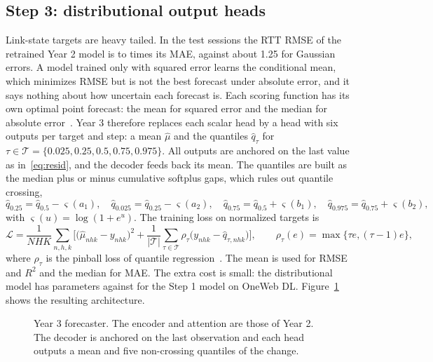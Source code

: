 \subsection{Step 3: distributional output heads}
Link-state targets are heavy tailed. In the test sessions the RTT RMSE of the retrained Year 2 model is \RatioRMSEMAEMin{} to \RatioRMSEMAEMax{} times its MAE, against about 1.25 for Gaussian errors. A model trained only with squared error learns the conditional mean, which minimizes RMSE but is not the best forecast under absolute error, and it says nothing about how uncertain each forecast is. Each scoring function has its own optimal point forecast: the mean for squared error and the median for absolute error~\cite{gneiting2011making}. Year 3 therefore replaces each scalar head by a head with six outputs per target and step: a mean $\hat{\mu}$ and the quantiles $\hat{q}_\tau$ for $\tau\in\mathcal{T}=\{0.025, 0.25, 0.5, 0.75, 0.975\}$. All outputs are anchored on the last value as in~\eqref{eq:resid}, and the decoder feeds back its mean. The quantiles are built as the median plus or minus cumulative softplus gaps, which rules out quantile crossing,
\begin{equation}
\hat{q}_{0.25}=\hat{q}_{0.5}-\varsigma(a_1),\quad \hat{q}_{0.025}=\hat{q}_{0.25}-\varsigma(a_2),\quad
\hat{q}_{0.75}=\hat{q}_{0.5}+\varsigma(b_1),\quad \hat{q}_{0.975}=\hat{q}_{0.75}+\varsigma(b_2),
\end{equation}
with $\varsigma(u)=\log(1+e^u)$. The training loss on normalized targets is
\begin{equation}
\mathcal{L} = \frac{1}{NHK}\sum_{n,h,k}\Big[\big(\hat{\mu}_{nhk}-y_{nhk}\big)^2 + \frac{1}{|\mathcal{T}|}\sum_{\tau\in\mathcal{T}}\rho_\tau\big(y_{nhk}-\hat{q}_{\tau,nhk}\big)\Big],
\qquad \rho_\tau(e)=\max\{\tau e,(\tau-1)e\},
\label{eq:loss}
\end{equation}
where $\rho_\tau$ is the pinball loss of quantile regression~\cite{koenker1978regression}. The mean is used for RMSE and $R^2$ and the median for MAE. The extra cost is small: the distributional model has \ParamsDist{} parameters against \ParamsResid{} for the Step 1 model on OneWeb DL. Figure~\ref{fig:arch} shows the resulting architecture.

\begin{figure}[t]
  \centering
  \resizebox{0.86\linewidth}{!}{}
  \caption{Year 3 forecaster. The encoder and attention are those of Year 2. The decoder is anchored on the last observation and each head outputs a mean and five non-crossing quantiles of the change.}
  \label{fig:arch}
\end{figure}

